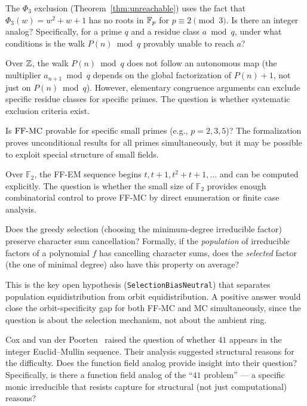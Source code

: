 \begin{openproblem}
The $\Phi_3$ exclusion (Theorem~\ref{thm:unreachable}) uses the fact that
$\Phi_3(w) = w^2 + w + 1$ has no roots in $\mathbb{F}_p$ for $p \equiv 2 \pmod{3}$.
Is there an integer analog? Specifically, for a prime $q$ and a residue
class $a \bmod q$, under what conditions is the walk $P(n) \bmod q$
provably unable to reach $a$?
\end{openproblem}

Over $\mathbb{Z}$, the walk $P(n) \bmod q$ does not follow an autonomous map
(the multiplier $a_{n+1} \bmod q$ depends on the global factorization of
$P(n)+1$, not just on $P(n) \bmod q$). However, elementary congruence
arguments can exclude specific residue classes for specific primes. The
question is whether systematic exclusion criteria exist.

\begin{openproblem}
Is $\mathrm{FF\text{-}MC}$ provable for specific small primes (e.g., $p = 2, 3, 5$)?
The formalization proves unconditional results for all primes simultaneously,
but it may be possible to exploit special structure of small fields.
\end{openproblem}

Over $\mathbb{F}_2$, the FF-EM sequence begins $t, t+1, t^2+t+1, \ldots$
and can be computed explicitly. The question is whether the small size
of $\mathbb{F}_2$ provides enough combinatorial control to prove FF-MC
by direct enumeration or finite case analysis.

\begin{openproblem}
Does the greedy selection (choosing the minimum-degree irreducible factor)
preserve character sum cancellation? Formally, if the \emph{population}
of irreducible factors of a polynomial $f$ has cancelling character sums,
does the \emph{selected} factor (the one of minimal degree) also have
this property on average?
\end{openproblem}

This is the key open hypothesis (\texttt{SelectionBiasNeutral}) that
separates population equidistribution from orbit equidistribution. A
positive answer would close the orbit-specificity gap for both FF-MC and
MC simultaneously, since the question is about the selection mechanism,
not about the ambient ring.

\begin{openproblem}
Cox and van der Poorten~\cite{CoxVdP} raised the question of whether $41$
appears in the integer Euclid--Mullin sequence. Their analysis suggested
structural reasons for the difficulty. Does the function field analog
provide insight into their question? Specifically, is there a function
field analog of the ``$41$ problem'' --- a specific monic irreducible
that resists capture for structural (not just computational) reasons?
\end{openproblem}

